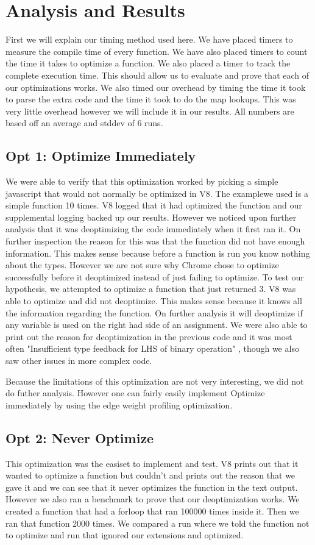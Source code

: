 \documentclass[twocolumn,showpacs,%
  nofootinbib,aps,superscriptaddress,%
  eqsecnum,prd,notitlepage,showkeys,10pt]{revtex4-1}
\begin{document}
\section{Analysis and Results}
First we will explain our timing method used here. We have placed timers to measure the compile time of every function. We have also placed timers to count the time it takes to optimize a function. We also placed a timer to track the complete execution time. This should allow us to evaluate and prove that each of our optimizations works. We also timed our overhead by timing the time it took to parse the extra code and the time it took to do the map lookups. This was very little overhead however we will include it in our results. All numbers are based off an average and stddev of 6 runs.

\subsection{Opt 1: Optimize Immediately}
We were able to verify that this optimization worked by picking a simple javascript that would not normally be optimized in V8. The examplewe used is a simple function 10 times. V8 logged that it had optimized the function and our supplemental logging backed up our results.  However we noticed upon further analysis that it was deoptimizing the code immediately when it first ran it. On further inspection the reason for this was that the function did not have enough information. This makes sense because before a function is run you know nothing about the types. However we are not sure why Chrome chose to optimize successfully before it deoptimized instead of just failing to optimize. To test our hypothesis, we attempted to optimize a function that just returned 3. V8 was able to optimize and did not deoptimize. This makes sense because it knows all the information regarding the function. On further analysis it will deoptimize if any variable is used on the right had side of an assignment. We were also able to print out the reason for deoptimization in the previous code and it was most often "Insufficient type feedback for LHS of binary operation" , though we also saw other issues in more complex code.

Because the limitations of this optimization are not very interesting, we did not do futher analysis. However one can fairly easily implement Optimize immediately by using the edge weight profiling optimization.

\subsection{Opt 2: Never Optimize}
This optimization was the easiset to implement and test. V8 prints out that it wanted to optimize a function but couldn't and prints out the reason that we gave it and we can see that it never optimizes the function in the text output. However we also ran a benchmark to prove that our deoptimization works. We created a function that had a forloop that ran 100000 times inside it. Then we ran that function 2000 times. We compared a run where we told the function not to optimize and run that ignored our extensions and optimized.\\ 
\end{document}
